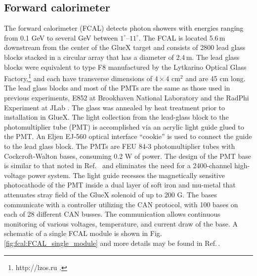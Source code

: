 \subsection{Forward calorimeter \label{sec:fcal}}
The forward calorimeter (FCAL) detects photon showers with energies ranging from 0.1 GeV to several GeV between $1^{\circ}$--$11^{\circ}$. The FCAL is located 5.6\,m downstream from the center of the GlueX target and consists of 2800 lead glass blocks stacked in a circular array that has a diameter of 2.4\,m.  The lead glass blocks were equivalent to type F8 manufactured by the Lytkarino Optical Glass Factory,\footnote{http://lzos.ru .} and each have transverse dimensions of $4\times4$ cm$^2$ and are 45 cm long. The lead glass blocks and most of the PMTs are the same as those used in previous experiments, E852 at Brookhaven National Laboratory 
\cite{CRITTENDEN1997377} and the RadPhi Experiment at JLab \cite{JONES2007384}. The glass was annealed by heat treatment prior to installation in GlueX. 
The light collection from the lead-glass block to the photomultiplier tube (PMT) is accomplished via an acrylic light guide glued to the PMT. An Eljen EJ-560 optical interface ``cookie'' is used to connect the guide to the lead glass block. 
The PMTs are FEU 84-3 photomultiplier tubes with Cockcroft-Walton bases, consuming 0.2 W of power.  The design of the PMT base is similar to that noted in Ref.~\cite{BRUNNER1998466}
and eliminates the need for a 2400-channel high-voltage power system. The light guide recesses the magnetically sensitive photocathode of the PMT inside a dual layer of soft iron and mu-metal that attenuates stray field of the GlueX solenoid of up to 200 G. The bases communicate with a controller utilizing the CAN protocol, with 100 bases on each of 28 different CAN busses.  The communication allows continuous monitoring of various voltages, temperature, and current draw of the base.
A schematic of a single FCAL module is shown in 
Fig.\,\ref{fig:fcal:FCAL_single_module} and more details may be found in Ref.\,\cite{MORIYA201360}.

